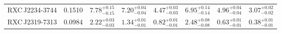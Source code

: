 \begin{table*}
\begin{tabular}{l l l r r l r r}
    RXC\,J2234-3744 & 0.1510 & $7.78_{-0.15}^{+0.15}$ & $ 7.20_{-0.04}^{+0.04}$ & $ 4.47_{-0.03}^{+0.03}$ & $6.95_{-0.14}^{+0.14}$ & $ 4.96_{-0.04}^{+0.04}$ & $ 3.07_{-0.02}^{+0.02}$ \\
    RXC\,J2319-7313 & 0.0984 & $2.22_{-0.03}^{+0.03}$ & $ 1.34_{-0.01}^{+0.01}$ & $ 0.82_{-0.01}^{+0.01}$ & $2.48_{-0.08}^{+0.08}$ & $ 0.63_{-0.01}^{+0.01}$ & $ 0.38_{-0.01}^{+0.01}$ \\
    \end{tabular}
    
\end{table*}
